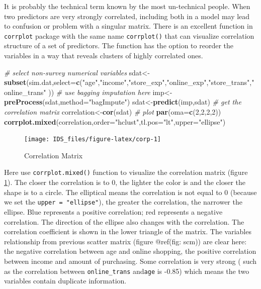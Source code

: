 \documentclass[12pt,]{krantz}
\newenvironment{Shaded}{\begin{snugshade}}{\end{snugshade}}
\newcommand{\KeywordTok}[1]{\textcolor[rgb]{0.13,0.29,0.53}{\textbf{#1}}}
\newcommand{\DataTypeTok}[1]{\textcolor[rgb]{0.13,0.29,0.53}{#1}}
\newcommand{\DecValTok}[1]{\textcolor[rgb]{0.00,0.00,0.81}{#1}}
\newcommand{\StringTok}[1]{\textcolor[rgb]{0.31,0.60,0.02}{#1}}
\newcommand{\CommentTok}[1]{\textcolor[rgb]{0.56,0.35,0.01}{\textit{#1}}}
\newcommand{\NormalTok}[1]{#1}
\theoremstyle{definition}
\theoremstyle{definition}
\theoremstyle{definition}
\theoremstyle{remark}
\begin{document}
It is probably the technical term known by the most un-technical people.
When two predictors are very strongly correlated, including both in a
model may lead to confusion or problem with a singular matrix. There is
an excellent function in \texttt{corrplot} package with the same name
\texttt{corrplot()} that can visualize correlation structure of a set of
predictors. The function has the option to reorder the variables in a
way that reveals clusters of highly correlated ones.

\begin{Shaded}
\begin{Highlighting}[]
\CommentTok{# select non-survey numerical variables}
\NormalTok{sdat<-}\KeywordTok{subset}\NormalTok{(sim.dat,}\DataTypeTok{select=}\KeywordTok{c}\NormalTok{(}\StringTok{"age"}\NormalTok{,}\StringTok{"income"}\NormalTok{,}\StringTok{"store_exp"}\NormalTok{,}\StringTok{"online_exp"}\NormalTok{,}\StringTok{"store_trans"}\NormalTok{,}\StringTok{"online_trans"}\NormalTok{ ))}
\CommentTok{# use bagging imputation here}
\NormalTok{imp<-}\KeywordTok{preProcess}\NormalTok{(sdat,}\DataTypeTok{method=}\StringTok{"bagImpute"}\NormalTok{)}
\NormalTok{sdat<-}\KeywordTok{predict}\NormalTok{(imp,sdat)}
\CommentTok{# get the correlation matrix}
\NormalTok{correlation<-}\KeywordTok{cor}\NormalTok{(sdat)}
\CommentTok{# plot }
\KeywordTok{par}\NormalTok{(}\DataTypeTok{oma=}\KeywordTok{c}\NormalTok{(}\DecValTok{2}\NormalTok{,}\DecValTok{2}\NormalTok{,}\DecValTok{2}\NormalTok{,}\DecValTok{2}\NormalTok{))}
\KeywordTok{corrplot.mixed}\NormalTok{(correlation,}\DataTypeTok{order=}\StringTok{"hclust"}\NormalTok{,}\DataTypeTok{tl.pos=}\StringTok{"lt"}\NormalTok{,}\DataTypeTok{upper=}\StringTok{"ellipse"}\NormalTok{)}
\end{Highlighting}
\end{Shaded}

\begin{figure}

{\centering \texttt{[image: IDS\_files/figure-latex/corp-1]} 

}

\caption{Correlation Matrix}\label{fig:corp}
\end{figure}

Here use \texttt{corrplot.mixed()} function to visualize the correlation
matrix (figure \ref{fig:corp}). The closer the correlation is to 0, the
lighter the color is and the closer the shape is to a circle. The
elliptical means the correlation is not equal to 0 (because we set the
\texttt{upper\ =\ "ellipse"}), the greater the correlation, the narrower
the ellipse. Blue represents a positive correlation; red represents a
negative correlation. The direction of the ellipse also changes with the
correlation. The correlation coefficient is shown in the lower triangle
of the matrix. The variables relationship from previous scatter matrix
(figure @ref(fig: scm)) are clear here: the negative correlation between
age and online shopping, the positive correlation between income and
amount of purchasing. Some correlation is very strong ( such as the
correlation between \texttt{online\_trans} and\texttt{age} is -0.85)
which means the two variables contain duplicate information.
\end{document}

